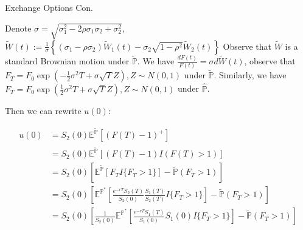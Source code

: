 \documentclass{beamer}
\begin{document}
\begin{frame}{Exchange Options Con.}
    
    {\footnotesize \footnotesize
    \par Denote $\sigma  = \sqrt{\sigma_1^2 - 2\rho\sigma_1\sigma_2 + \sigma_2^2}$, $\tilde{W}(t) := \frac{1}{\sigma} \left\{ (\sigma_1 - \rho\sigma_2)\tilde{W}_1(t) - \sigma_2\sqrt{1 - \rho^2}\tilde{W}_2(t) \right\}$
    Observe that $\tilde{W}$ is a standard Brownian motion under $\tilde{\mathbb{P}}$. 
    We have $\frac{dF(t)}{F(t)} = \sigma d\tilde{W}(t)$, observe that $F_T = F_0 \exp \left( - \frac{1}{2} \sigma^2 T 
    + \sigma \sqrt{T} Z \right),  Z \sim N(0, 1)$ under $\tilde{\mathbb{P}}$. Similarly, we have 
    $F_T = F_0 \exp \left(  \frac{1}{2} \sigma^2 T 
    + \sigma \sqrt{T} Z \right),  Z \sim N(0, 1)$ under $\hat{\mathbb{P}}$.
    \vspace{1em}
     \par Then we can rewrite $u(0)$:
     
     \begin{align*}
        u(0) &= S_2(0) \mathbb{E}^{\tilde{\mathbb{P}}} \left[ (F(T) - 1)^+ \right]\\
        &= S_2(0) \mathbb{E}^{\tilde{\mathbb{P}}} \left[ (F(T) - 1)I(F(T)>1) \right]\\
        &=S_2(0) \left[ \mathbb{E}^{\tilde{\mathbb{P}}}[F_T I{\{F_T > 1\}}] 
        - \tilde{\mathbb{P}}(F_T > 1)\right] \\
        &=S_2(0) \left[ \mathbb{E}^{\mathbb{P}^*}[\frac{e^{-rT} S_2(T)}{S_2(0)} \frac{S_1(T)}{S_2(T)} I{\{F_T > 1\}}] 
        - \tilde{\mathbb{P}}(F_T > 1)\right] \\
        &=S_2(0) \left[ \frac{1}{S_2(0)}\mathbb{E}^{\mathbb{P}^*}[\frac{e^{-rT} S_1(T)}{S_1(0)} S_1(0) I{\{F_T > 1\}}] 
        - \tilde{\mathbb{P}}(F_T > 1)\right] \\
     \end{align*}
    
    }

\end{frame}
\end{document}
